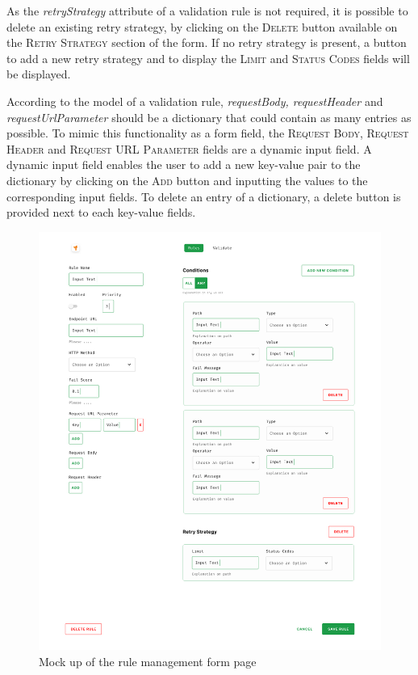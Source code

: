 As the \emph{retryStrategy} attribute of a validation rule is not required, it is possible to delete an existing retry strategy, by clicking on the \textsc{Delete} button available on the \textsc{Retry Strategy} section of the form. If no retry strategy is present, a button to add a new retry strategy and to display the \textsc{Limit} and \textsc{Status Codes} fields will be displayed.

According to the model of a validation rule, \emph{requestBody, requestHeader} and \emph{requestUrlParameter} should be a dictionary that could contain as many entries as possible. To mimic this functionality as a form field, the \textsc{Request Body, Request Header} and \textsc{Request URL Parameter} fields are a dynamic input field. A dynamic input field enables the user to add a new key-value pair to the dictionary by clicking on the \textsc{Add} button and inputting the values to the corresponding input fields. To delete an entry of a dictionary, a delete button is provided next to each key-value fields. 

\begin{figure}[!h]
 \includegraphics[width=\textwidth]{diagrams/mockup_rule_management.png}
 \caption{Mock up of the rule management form page}
\end{figure}

